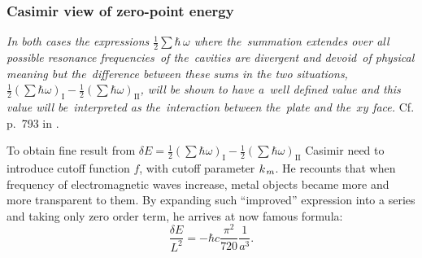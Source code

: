 \documentclass[10pt,t]{beamer}
\begin{document}
\begin{frame}
  \frametitle{Casimir view of zero-point energy}



  \textit{In both cases the expressions $\frac{ 1 }{ 2 } \sum \hbar \, \omega$ where
    the~summation extendes over all possible resonance frequencies~of
    the~cavities are divergent and devoid~of physical meaning but
    the~\textit{difference} between these sums in the two situations,
    $\frac{ 1 }{ 2 } ( \sum \hbar \omega )_{ \text{I} } -
    \frac{ 1 }{ 2 } ( \sum \hbar \omega )_{ \text{II} }$, will be shown to have
    a~well defined value and this value will be~interpreted as
    the~interaction between the~plate and the~$xy$ face.} Cf. p.~793 in
  \parencite{Casimir-On-the-Attraction-Between-ETC-Pub-1948}.

  To obtain fine result from
  $\delta E = \frac{ 1 }{ 2 } ( \sum \hbar \omega )_{ \text{I} } -
  \frac{ 1 }{ 2 } ( \sum \hbar \omega )_{ \text{II} }$ Casimir need to introduce
  cutoff function{ } $f$, with cutoff parameter $k_{ \hspace{0.09em} m }$. He
  recounts that when frequency of electromagnetic
  waves increase, metal objects became more and more transparent to them.
  By expanding such ``improved'' expression into a series and taking only
  zero order term, he arrives at now famous formula:
  \begin{equation}
    \label{eq:First-theoretical-works-01}
    \frac{ \delta E }{ L^{ 2 } } =
    -\hbar c \frac{ \pi^{ 2 } }{ 720 } \frac{ 1 }{ a^{ 3 } }.
  \end{equation}


\end{frame}
\end{document}
